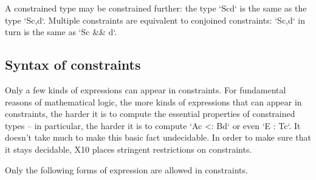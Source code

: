 A constrained type may be constrained further: the type \xcd`S{c}{d}`
is the same as the type \xcd`S{c,d}`.  Multiple constraints are equivalent to
conjoined constraints: \xcd`S{c,d}` in turn is the same as \xcd`S{c && d}`.

\subsection{Syntax of constraints}
\label{PermittedConstraints}


Only a few kinds of expressions can appear in constraints.  For fundamental
reasons of mathematical logic, the more kinds of expressions that can appear
in constraints, the harder it is to compute the essential properties of
constrained types -- in particular, the harder it is to compute 
\xcd`A{c} <: B{d}` or even \xcd`E : T{c}`.  It doesn't take much to make this
basic fact undecidable. 
In order to make sure that it stays decidable, X10 places stringent restrictions on
constraints.  

Only the following forms of expression are allowed in constraints.  

